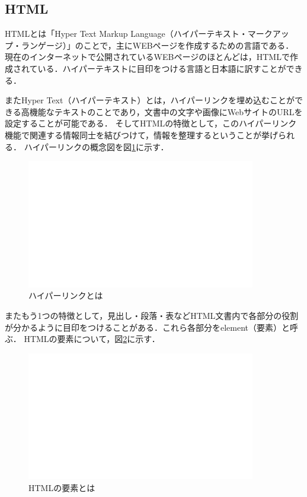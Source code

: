 \documentclass[12pt,a4j]{ltjsarticle}
\begin{document}
\subsection{HTML}
HTMLとは「Hyper Text Markup Language（ハイパーテキスト・マークアップ・ランゲージ）」のことで，主にWEBページを作成するための言語である\cite{html}．
現在のインターネットで公開されているWEBページのほとんどは，HTMLで作成されている．ハイパーテキストに目印をつける言語と日本語に訳すことができる．

またHyper Text（ハイパーテキスト）とは，ハイパーリンクを埋め込むことができる高機能なテキストのことであり，文書中の文字や画像にWebサイトのURLを設定することが可能である．
そしてHTMLの特徴として，このハイパーリンク機能で関連する情報同士を結びつけて，情報を整理するということが挙げられる．
ハイパーリンクの概念図を図\ref{fig:hyper}に示す．
\begin{figure}[h]
\begin{center}
\includegraphics[width = 100mm ] {figures/figure_sample.pdf}
\caption{ハイパーリンクとは}
\end{center}
\label{fig:hyper}
\end{figure}


またもう1つの特徴として，見出し・段落・表などHTML文書内で各部分の役割が分かるように目印をつけることがある．これら各部分をelement（要素）と呼ぶ．
HTMLの要素について，図\ref{fig:html_elem}に示す．
\begin{figure}[h]
\begin{center}
\includegraphics[width = 100mm ] {figures/figure_sample.pdf}
\caption{HTMLの要素とは}
\end{center}
\label{fig:html_elem}
\end{figure}
\end{document}
